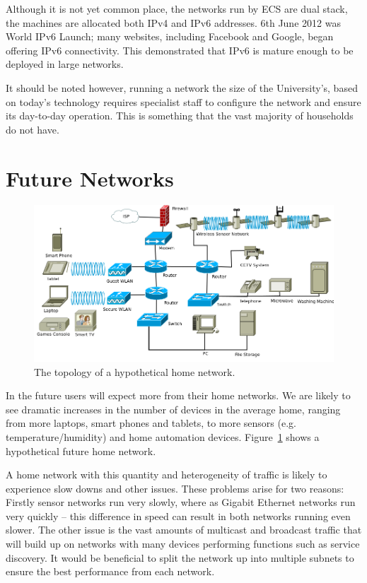 \documentclass[12pt,a4paper,twoside]{report}
\begin{document}
Although it is not yet common place, the networks run by ECS are dual stack,
the machines are allocated both IPv4 and IPv6 addresses. 6th June 2012 was
World IPv6 Launch; many websites, including Facebook and Google, began offering
IPv6 connectivity. \cite{IPv6Launch} This demonstrated that IPv6 is mature
enough to be deployed in large networks.

It should be noted however, running a network the size of the University's,
based on today's technology requires specialist staff to configure the
network and ensure its day-to-day operation. This is something that the vast
majority of households do not have.

\section{Future Networks}
\begin{figure}
\begin{center}
	\includegraphics[width=\linewidth]{../Diagrams/Network/FutureHomenet.png}
	\caption{The topology of a hypothetical home network.}\label{fig:future_net}
\end{center}
\end{figure}
In the future users will expect more from their home networks. We are likely to
see dramatic increases in the number of devices in the average home, ranging
from more laptops, smart phones and tablets, to more sensors (e.g.\@
temperature/humidity) and home automation devices. Figure~\ref{fig:future_net}
shows a hypothetical future home network.

A home network with this quantity and heterogeneity of traffic is likely to
experience slow downs and other issues. These problems arise for two reasons:
Firstly sensor networks run very slowly, where as Gigabit Ethernet networks run
very quickly -- this difference in speed can result in both networks running
even slower. The other issue is the vast amounts of multicast and broadcast
traffic that will build up on networks with many devices performing functions
such as service discovery. It would be beneficial to split the network up into
multiple subnets to ensure the best performance from each network. 
\end{document}
